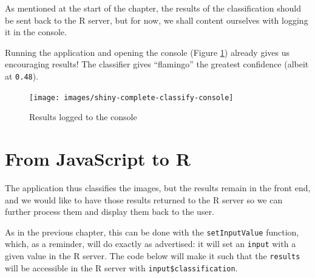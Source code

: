 \documentclass[10pt,]{krantz}
\begin{document}
As mentioned at the start of the chapter, the results of the classification should be sent back to the R server, but for now, we shall content ourselves with logging it in the console.

Running the application and opening the console (Figure \ref{fig:shiny-complete-classify-console}) already gives us encouraging results! The classifier gives ``flamingo'' the greatest confidence (albeit at \texttt{0.48}).

\begin{figure}[H]

{\centering \texttt{[image: images/shiny-complete-classify-console]} 

}

\caption{Results logged to the console}\label{fig:shiny-complete-classify-console}
\end{figure}

\hypertarget{shiny-complete-js2r}{%
\section{From JavaScript to R}\label{shiny-complete-js2r}}

The application thus classifies the images, but the results remain in the front end, and we would like to have those results returned to the R server so we can further process them and display them back to the user.

As in the previous chapter, this can be done with the \texttt{setInputValue} function, which, as a reminder, will do exactly as advertised: it will set an \texttt{input} with a given value in the R server. The code below will make it such that the \texttt{results} will be accessible in the R server with \texttt{input\$classification}.
\end{document}
